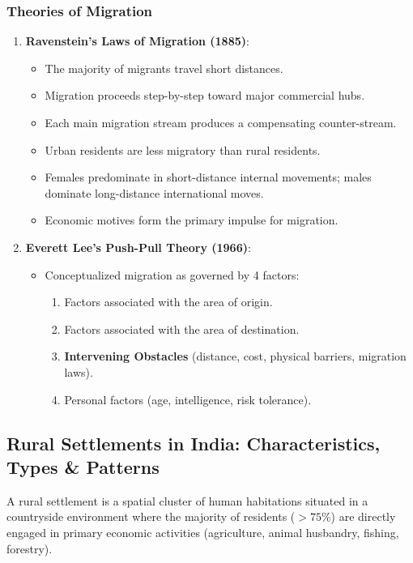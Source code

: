 \documentclass[11pt,a4paper]{article}
\begin{document}
\subsubsection{Theories of Migration}
\begin{enumerate}[leftmargin=*]
  \item \textbf{Ravenstein's Laws of Migration (1885)}:
  \begin{itemize}
    \item The majority of migrants travel short distances.
    \item Migration proceeds step-by-step toward major commercial hubs.
    \item Each main migration stream produces a compensating counter-stream.
    \item Urban residents are less migratory than rural residents.
    \item Females predominate in short-distance internal movements; males dominate long-distance international moves.
    \item Economic motives form the primary impulse for migration.
  \end{itemize}

  \item \textbf{Everett Lee's Push-Pull Theory (1966)}:
  \begin{itemize}
    \item Conceptualized migration as governed by 4 factors:
    \begin{enumerate}
      \item Factors associated with the area of origin.
      \item Factors associated with the area of destination.
      \item \textbf{Intervening Obstacles} (distance, cost, physical barriers, migration laws).
      \item Personal factors (age, intelligence, risk tolerance).
    \end{enumerate}
  \end{itemize}
\end{enumerate}

\newpage
\subsection{Rural Settlements in India: Characteristics, Types & Patterns}

\begin{defbox}
A rural settlement is a spatial cluster of human habitations situated in a countryside environment where the majority of residents ($>75\%$) are directly engaged in primary economic activities (agriculture, animal husbandry, fishing, forestry).
\end{defbox}
\end{document}
